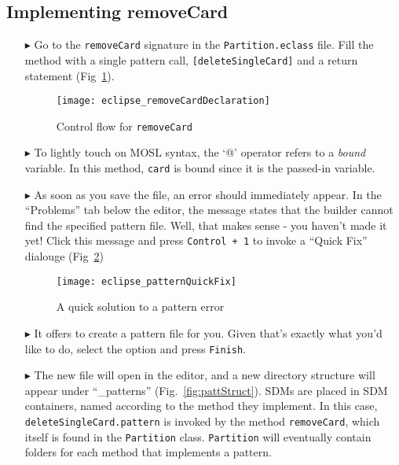 \newpage
\hypertarget{remCard tex}{}
\subsection{Implementing removeCard}
\texHeader

\begin{itemize}

\item[$\blacktriangleright$] Go to the \texttt{removeCard} signature in the \texttt{Partition.eclass} file. Fill the method with a single pattern call,
\texttt{[deleteSingleCard]} and a return statement (Fig~\ref{fig:remCardDec}).

\begin{figure}[htp]
\begin{center}
  \texttt{[image: eclipse\_removeCardDeclaration]}
  \caption{Control flow for \texttt{removeCard}}
  \label{fig:remCardDec}
\end{center}
\end{figure}

\item[$\blacktriangleright$] To lightly touch on MOSL syntax, the `@' operator refers to a \emph{bound} variable. In this method, \texttt{card} is bound since
it is the passed-in variable.

\item[$\blacktriangleright$] As soon as you save the file, an error should immediately appear. In the ``Problems'' tab below the editor, the message states that
the builder cannot find the specified pattern file. Well, that makes sense - you haven't made it yet! Click this message and press \texttt{Control + 1} to
invoke a ``Quick Fix'' dialouge (Fig~\ref{fig:quixFix})

\begin{figure}[htp]
\begin{center}
  \texttt{[image: eclipse\_patternQuickFix]}
  \caption{A quick solution to a pattern error}
  \label{fig:quixFix}
\end{center}
\end{figure}

\item[$\blacktriangleright$] It offers to create a pattern file for you. Given that's exactly what you'd like to do, select the option and press
\texttt{Finish}.

\item[$\blacktriangleright$] The new file will open in the editor, and a new directory structure will appear under ``\_patterns'' (Fig.~\ref{fig:pattStruct}). SDMs are
placed in SDM containers, named according to the method they implement. In this case, \texttt{deleteSingleCard.pattern} is invoked by the method \texttt{removeCard},
which itself is found in the \texttt{Partition} class. \texttt{Partition} will eventually contain folders for each method that implements a pattern.


\end{itemize}
